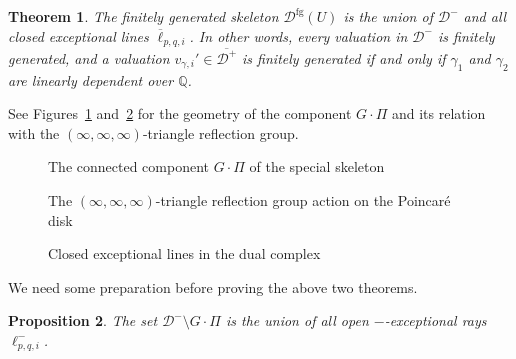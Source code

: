 \documentclass[reqno, 12pt]{amsart}
\newtheorem{prop}{Proposition}[section]
\newtheorem{thm}[prop]{Theorem}
\theoremstyle{definition}
\newcommand{\bQ}{\mathbb{Q}}
\newcommand{\cD}{\mathcal{D}}
\newcommand{\rfg}{\mathrm{fg}}
\newcommand{\oell}{\overline{\ell}}
\numberwithin{equation}{section}
\begin{document}
\begin{thm}\label{thm:markov-fg}
The finitely generated skeleton $\cD^{\rfg}(U)$ is the union of $\cD^-$ and all closed exceptional lines $\oell_{p,q,i}$. In other words, every valuation in $\cD^-$ is finitely generated, and a valuation $v_{\gamma,i}'\in \overline{\cD^+}$ is finitely generated if and only if $\gamma_1$ and $\gamma_2$ are linearly dependent over $\bQ$. 
\end{thm}

See Figures~\ref{fig:SV-Markov} and~\ref{fig:hyp-reflection} for the geometry of the component
$G\cdot\Pi$ and its relation with the
$(\infty,\infty,\infty)$-triangle reflection group.

\begin{figure}[htbp] %
    \centering
        
    \caption{The connected component $G\cdot \Pi$ of the special skeleton}
    \label{fig:SV-Markov}
\end{figure}




\begin{figure}[htbp] %
    \centering
    \caption{The $(\infty,\infty,\infty)$-triangle reflection group action on the Poincar\'e disk}
    \label{fig:hyp-reflection}
\end{figure}

\begin{figure}[htbp] %
    \centering
        
    \caption{Closed exceptional lines in the dual complex}
    \label{fig:exc-lines}
\end{figure}


We need some preparation before proving the above two theorems.

\begin{prop}\label{prop:exc-rays}
The set $\cD^- \setminus G\cdot \Pi$ is the union of all open $-$-exceptional rays $\ell^-_{p,q,i}$. 
\end{prop}
\end{document}
